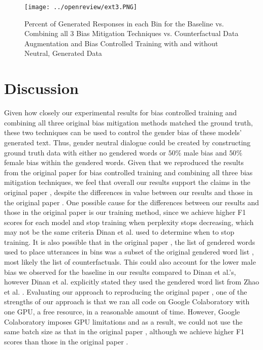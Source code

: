 \begin{figure}[h!]
    \centering
    \texttt{[image: ../openreview/ext3.PNG]}
    \caption{Percent of Generated Responses in each Bin for the Baseline vs. Combining all 3 Bias Mitigation Techniques vs. Counterfactual Data Augmentation and Bias Controlled Training with and without Neutral, Generated Data}
    \label{fig:ext3Results}
\end{figure}

\section{Discussion}

Given how closely our experimental results for bias controlled training and combining all three original bias mitigation methods matched the ground truth, these two techniques can be used to control the gender bias of these models’ generated text. Thus, gender neutral dialogue could be created by constructing ground truth data with either no gendered words or $50\%$ male bias and $50\%$ female bias within the gendered words. Given that we reproduced the results from the original paper \supercite{dinan2020} for bias controlled training and combining all three bias mitigation techniques, we feel that overall our results support the claims in the original paper \supercite{dinan2020}, despite the differences in value between our results and those in the original paper \supercite{dinan2020}. One possible cause for the differences between our results and those in the original paper \supercite{dinan2020} is our training method, since we achieve higher F1 scores for each model and stop training when perplexity stops decreasing, which may not be the same criteria Dinan et al. used to determine when to stop training. It is also possible that in the original paper \supercite{dinan2020}, the list of gendered words used to place utterances in bins was a subset of the original gendered word list \supercite{zhao-etal-2018-learning}, most likely the list of counterfactuals. This could also account for the lower male bias we observed for the baseline in our results compared to Dinan et al.’s, however Dinan et al. explicitly stated they used the gendered word list from Zhao et al. \supercite{zhao-etal-2018-learning}. Evaluating our approach to reproducing the original paper \supercite{dinan2020}, one of the strengths of our approach is that we ran all code on Google Colaboratory with one GPU, a free resource, in a reasonable amount of time. However, Google Colaboratory imposes GPU limitations and as a result, we could not use the same batch size as that in the original paper \supercite{dinan2020}, although we achieve higher F1 scores than those in the original paper \supercite{dinan2020}.

